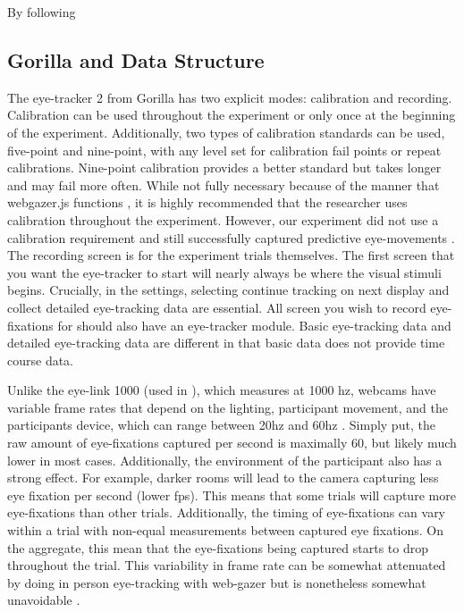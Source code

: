 By following 


\subsection{Gorilla and Data Structure}

The eye-tracker 2 from Gorilla has two explicit modes: calibration and recording. Calibration can be used throughout the experiment or only once at the beginning of the experiment. Additionally, two types of calibration standards can be used, five-point and nine-point, with any level set for calibration fail points or repeat calibrations. Nine-point calibration provides a better standard but takes longer and may fail more often. While not fully necessary because of the manner that webgazer.js functions \parencite[e.g.,][]{ Chen_et_al_2001}, it is highly recommended that the researcher uses calibration throughout the experiment. However, our experiment did not use a calibration requirement and still successfully captured predictive eye-movements \parencite[][]{Prystauka_Altmann_Rothman_2023}. The recording screen is for the experiment trials themselves. The first screen that you want the eye-tracker to start will nearly always be where the visual stimuli begins. Crucially, in the settings, selecting continue tracking on next display and collect detailed eye-tracking data are essential. All screen you wish to record eye-fixations for should also have an eye-tracker module. Basic eye-tracking data and detailed eye-tracking data are different in that basic data does not provide time course data. 

Unlike the eye-link 1000 (used in \parencite{Porretta_et_al_2020}), which measures at 1000 hz, webcams have variable frame rates that depend on the lighting, participant movement, and the participants device, which can range between 20hz and 60hz \parencite{Vos_2017}. Simply put, the raw amount of eye-fixations captured per second is maximally 60, but likely much lower in most cases. Additionally, the environment of the participant also has a strong effect. For example, darker rooms will lead to the camera capturing less eye fixation per second (lower fps). This means that some trials will capture more eye-fixations than other trials. \parencite{} Additionally, the timing of eye-fixations can vary within a trial with non-equal measurements between captured eye fixations. On the aggregate, this mean that the eye-fixations being captured starts to drop throughout the trial. This variability in frame rate can be somewhat attenuated by doing in person eye-tracking with web-gazer but is nonetheless somewhat unavoidable \parencite[e.g.,][]{}{}{}. 

